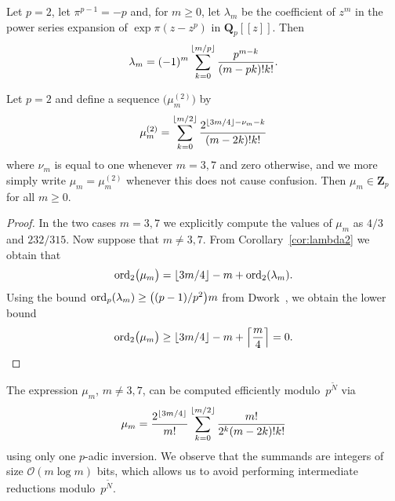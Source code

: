 \begin{cor} \label{cor:lambda2}
Let $p = 2$, let $\pi^{p-1} = -p$ and, for $m \geq 0$, let $\lambda_m$ 
be the coefficient of $z^m$ in the power series expansion of 
$\exp \pi (z - z^p)$ in $\mathbf{Q}_p[[z]]$.  Then 
\begin{equation*}
\lambda_m = (-1)^m \sum_{k=0}^{\left\lfloor m/p\right\rfloor} \frac{p^{m - k}}{(m - pk)! k!}.
\end{equation*}
\end{cor}

\begin{lem} \label{lem:mu2}
Let $p = 2$ and define a sequence $\bigl(\mu_m^{(2)}\bigr)$ by 
\begin{equation*}
\mu_m^{(2)} = 
    \sum_{k=0}^{\left\lfloor m/2\right\rfloor} \frac{2^{\left\lfloor3m/4\right\rfloor - \nu_m - k}}{(m-2k)! k!}
\end{equation*}
where $\nu_m$ is equal to one whenever $m = 3, 7$ and zero otherwise, 
and we more simply write $\mu_m =\mu_m^{(2)}$ whenever this does not 
cause confusion.  Then $\mu_m \in \mathbf{Z}_p$ for all $m \geq 0$.
\end{lem}

\begin{proof}
In the two cases $m = 3, 7$ we explicitly compute the values of 
$\mu_m$ as $4/3$ and $232/315$.  Now suppose that $m \neq 3, 7$. 
From Corollary~\ref{cor:lambda2} we obtain that 
\begin{equation*}
\operatorname{ord}_2 \bigl(\mu_m\bigr) 
    = \left\lfloor3m/4\right\rfloor - m + \operatorname{ord}_2(\lambda_m).
\end{equation*}
Using the bound $\operatorname{ord}_p(\lambda_m) \geq \bigl((p-1)/p^2\bigr) m$ from 
Dwork~\citep[Pages~55--57]{Dwork62}, we obtain the lower bound 
\begin{equation*}
\operatorname{ord}_2 \bigl(\mu_m\bigr) 
    \geq \left\lfloor3m/4\right\rfloor - m + \left\lceil\frac{m}{4}\right\rceil = 0. \qedhere
\end{equation*}
\end{proof}

\begin{rem}
The expression $\mu_m$, $m \neq 3, 7$, can be computed efficiently 
modulo~$p^{\tilde{N}}$ via
\begin{equation*}
\mu_m = \frac{2^{\left\lfloor3m/4\right\rfloor}}{m!} 
    \sum_{k=0}^{\left\lfloor m/2\right\rfloor} \frac{m!}{2^k (m-2k)! k!}
\end{equation*}
using only one $p$-adic inversion.  We observe that the summands are 
integers of size $\mathcal{O}(m \log m)$ bits, which allows us to 
avoid performing intermediate reductions modulo~$p^{\tilde{N}}$.
\end{rem}

